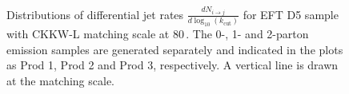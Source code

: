 \begin{figure}[h!]
	\centering  
	\hfill
	\hfill
	\hfill
  \caption{Distributions of differential jet rates $\frac{dN_{i\to j}}{d \log_{10}(k_\textrm{cut})}$ for EFT D5 sample with CKKW-L matching scale at 80\,\gev. The 0-, 1- and 2-parton emission samples are generated separately and indicated in the plots as Prod 1, Prod 2 and Prod 3, respectively. A vertical line is drawn at the matching scale.}
  \label{fig:CKKW_D5_80}
\end{figure}


